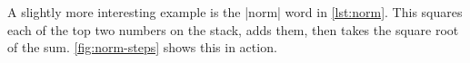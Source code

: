 A slightly more interesting example is the \factor|norm| word in
\vref{lst:norm}.  This squares each of the top two numbers on the stack, adds
them, then takes the square root of the sum.  \vref{fig:norm-steps} shows this
in action.



